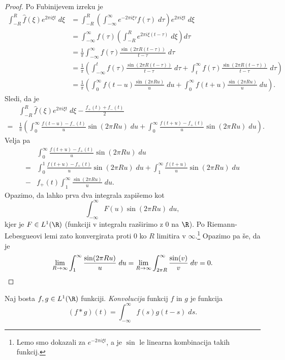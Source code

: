 \begin{proof}
Po Fubinijevem izreku je
\begin{align*}
\int_{-R}^R \hat{f}(\xi) e^{2\pi i \xi t}\;d\xi
&=
\int_{-R}^R \left(
\int_{-\infty}^\infty e^{-2\pi i \xi \tau} f(\tau)\;d\tau
\right) e^{2\pi i \xi t}\;d\xi
\\
&=
\int_{-\infty}^\infty f(\tau) \left(
\int_{-R}^R e^{2\pi i \xi (t-\tau)}\;d\xi
\right)d\tau
\\
&=
\frac{1}{\pi} \int_{-\infty}^\infty f(\tau)
\frac{\sin(2 \pi R (t - \tau))}{t - \tau}\;d\tau
\\
&=
\frac{1}{\pi} \left(
\int_{-\infty}^t f(\tau)
\frac{\sin(2 \pi R (t - \tau))}{t - \tau}\;d\tau
+
\int_t^\infty f(\tau)
\frac{\sin(2 \pi R (t - \tau))}{t - \tau}\;d\tau
\right)
\\
&=
\frac{1}{\pi} \left(
\int_0^\infty f(t - u)
\frac{\sin(2 \pi R u)}{u}\;du
+
\int_0^\infty f(t + u)
\frac{\sin(2 \pi R u)}{u}\;du
\right).
\end{align*}
Sledi, da je
\begin{align*}
&\int_{-R}^R \hat{f}(\xi)e^{2 \pi i \xi t}\;d\xi -
\frac{f_+(t) + f_-(t)}{2}
\\
=
&\frac{1}{\pi} \left(
\int_0^\infty \frac{f(t - u) - f_-(t)}{u} \sin(2 \pi R u)\;du
+
\int_0^\infty \frac{f(t + u) - f_+(t)}{u} \sin(2 \pi R u)\;du
\right).
\end{align*}
Velja pa
\begin{align*}
&\int_0^\infty \frac{f(t + u) - f_+(t)}{u} \sin(2 \pi R u)\;du
\\
=
&\int_0^1 \frac{f(t + u) - f_+(t)}{u} \sin(2 \pi R u)\;du +
\int_1^\infty \frac{f(t + u)}{u} \sin(2 \pi R u)\;du
\\
-
&f_+(t) \int_1^\infty \frac{\sin(2 \pi R u)}{u}\;du.
\end{align*}
Opazimo, da lahko prva dva integrala zapišemo kot
\[
\int_{-\infty}^\infty F(u) \sin(2 \pi R u)\;du,
\]
kjer je $F \in L^1(\R)$ (funkciji v integralu razširimo z $0$ na
$\R$). Po Riemann-Lebesgueovi lemi zato konvergirata proti $0$ ko
$R$ limitira v $\infty$.\footnote{Lemo smo dokazali za
$e^{-2 \pi i \xi t}$, a je $\sin$ le linearna kombinacija takih
funkcij.} Opazimo pa še, da je
\[
\lim_{R \to \infty} \int_1^\infty \frac{\sin(2 \pi R u)}{u}\;du =
\lim_{R \to \infty} \int_{2 \pi R}^\infty \frac{\sin(v)}{v}\;dv =
0. \qedhere
\]
\end{proof}

\begin{definicija}
Naj bosta $f,g \in L^1(\R)$ funkciji.
\emph{Konvolucija} funkcij $f$ in $g$ je
funkcija
\[
(f * g)(t) = \int_{-\infty}^\infty f(s) g(t - s)\;ds.
\]
\end{definicija}

